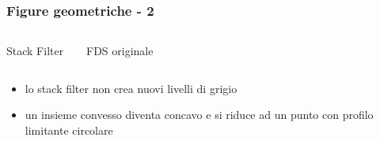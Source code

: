 \documentclass{beamer}
\begin{document}
\begin{frame}

  \frametitle{Figure geometriche - 2}
\vspace*{-0.5em}
  \begin{columns}

    \begin{center}
Stack Filter\\  
\vspace*{-1.1em}
    \begin{figure}
      
    \end{figure}
    \end{center}

    \begin{center}
FDS originale\\  
\vspace*{-1.1em}
    \begin{figure}
      
    \end{figure}
    \end{center}

  \end{columns}

  \begin{block}{}
   \begin{itemize}
    \item lo stack filter non crea nuovi livelli di grigio
    \item un insieme convesso diventa concavo e si riduce ad un punto con profilo limitante circolare 
   \end{itemize}
  \end{block}
 
\end{frame}
\end{document}
